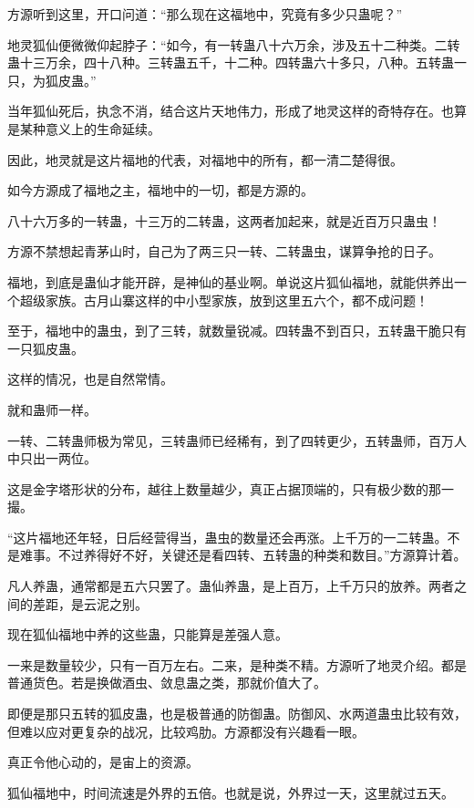 
\begin{this_body}

方源听到这里，开口问道：“那么现在这福地中，究竟有多少只蛊呢？”

地灵狐仙便微微仰起脖子：“如今，有一转蛊八十六万余，涉及五十二种类。二转蛊十三万余，四十八种。三转蛊五千，十二种。四转蛊六十多只，八种。五转蛊一只，为狐皮蛊。”

当年狐仙死后，执念不消，结合这片天地伟力，形成了地灵这样的奇特存在。也算是某种意义上的生命延续。

因此，地灵就是这片福地的代表，对福地中的所有，都一清二楚得很。

如今方源成了福地之主，福地中的一切，都是方源的。

八十六万多的一转蛊，十三万的二转蛊，这两者加起来，就是近百万只蛊虫！

方源不禁想起青茅山时，自己为了两三只一转、二转蛊虫，谋算争抢的日子。

福地，到底是蛊仙才能开辟，是神仙的基业啊。单说这片狐仙福地，就能供养出一个超级家族。古月山寨这样的中小型家族，放到这里五六个，都不成问题！

至于，福地中的蛊虫，到了三转，就数量锐减。四转蛊不到百只，五转蛊干脆只有一只狐皮蛊。

这样的情况，也是自然常情。

就和蛊师一样。

一转、二转蛊师极为常见，三转蛊师已经稀有，到了四转更少，五转蛊师，百万人中只出一两位。

这是金字塔形状的分布，越往上数量越少，真正占据顶端的，只有极少数的那一撮。

“这片福地还年轻，日后经营得当，蛊虫的数量还会再涨。上千万的一二转蛊。不是难事。不过养得好不好，关键还是看四转、五转蛊的种类和数目。”方源算计着。

凡人养蛊，通常都是五六只罢了。蛊仙养蛊，是上百万，上千万只的放养。两者之间的差距，是云泥之别。

现在狐仙福地中养的这些蛊，只能算是差强人意。

一来是数量较少，只有一百万左右。二来，是种类不精。方源听了地灵介绍。都是普通货色。若是换做酒虫、敛息蛊之类，那就价值大了。

即便是那只五转的狐皮蛊，也是极普通的防御蛊。防御风、水两道蛊虫比较有效，但难以应对更复杂的战况，比较鸡肋。方源都没有兴趣看一眼。

真正令他心动的，是宙上的资源。

狐仙福地中，时间流速是外界的五倍。也就是说，外界过一天，这里就过五天。


\end{this_body}
